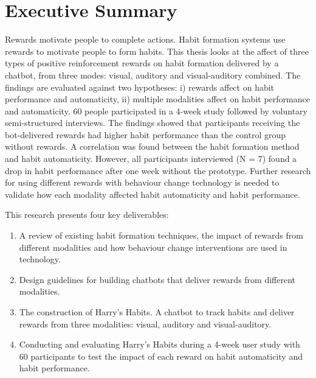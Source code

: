 
\section*{Executive Summary}
Rewards motivate people to complete actions. Habit formation systems use rewards to motivate people to form habits. This thesis looks at the affect of three types of positive reinforcement rewards on habit formation delivered by a chatbot, from three modes: visual, auditory and visual-auditory combined. The findings are evaluated against two hypotheses: i) rewards affect on habit performance and automaticity, ii) multiple modalities affect on habit performance and automaticity. 60 people participated in a 4-week study followed by voluntary semi-structured interviews. The findings showed that participants receiving the bot-delivered rewards had higher habit performance than the control group without rewards. A correlation was found between the habit formation method and habit automaticity. However, all participants interviewed (N = 7) found a drop in habit performance after one week without the prototype. Further research for using different rewards with behaviour change technology is needed to validate how each modality affected habit automaticity and habit performance.


This research presents four key deliverables:

\begin{enumerate}
  \item A review of existing habit formation techniques, the impact of rewards from different modalities and how behaviour change interventions are used in technology.
  \item Design guidelines for building chatbots that deliver rewards from different modalities.
  \item The construction of Harry's Habits. A chatbot to track habits and deliver rewards from three modalities: visual, auditory and visual-auditory.
  \item Conducting and evaluating Harry's Habits during a 4-week user study with 60 participants to test the impact of each reward on habit automaticity and habit performance.
\end{enumerate}

\newpage



